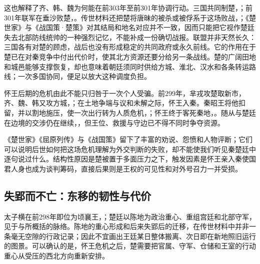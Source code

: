 这也解释了齐、韩、魏为何能在前303年至前301年协调行动。三国共同制楚，；前301年联军在垂沙败楚，。传世材料还把楚将唐昧的被杀或被俘系于这场败战，；《楚世家》与《战国策·楚策》对其结局和地名对应并不一致，因而只能把它视作楚廷失去北部防线统帅的一种强烈记忆，不能补成一份确切战报。联盟并非天然长久：三国各有对楚的顾虑，战后也没有形成稳定的共同政府或永久前线。它的作用在于楚已在对秦竞争中付出代价时，使其北方资源还要分给另一条战线。楚的广阔田地和城邑能够支撑恢复，却也意味着朝廷须同时供给方城、淮北、汉水和各条转运路线；一次多国协同，便足以放大这种调度负担。

怀王后期的危机由此不能只归咎于一次个人受骗。前299年，芈戎攻楚取新市，齐、魏、韩又攻方城，；在土地争端与议和未解之际，怀王入秦。秦昭王将他扣留，并以割地施压，使一次出行转为人质危机，；怀王终于客死秦地，。随从与楚廷在边境的交涉仍在继续，，但王位、救援与守边已不得不同时争夺资源。

《楚世家》《屈原列传》与《战国策》留下了丰富的劝说、怨愤和人物评断；它们可以说明后世如何把这场危机理解为外交判断的失败，却不能使我们听见秦楚廷中逐句说过什么。结构性原因是楚被置于多面压力之下，触发因素是怀王亲入秦使国君人身也成为谈判筹码，直接后果则是王权的可见性和对外号召力一并受损。

\subsection{失郢而不亡：东移的韧性与代价}

太子横在前298年即位为顷襄王，；楚廷以陈地为政治重心、重组宫廷和北部守军，见于与所概括的脉络。陈地的重心形成和后来失郢后的迁移，在传世材料中并非一条毫无空隙的行政记录；因此不宜画出王廷某日整体搬离、次日即在新地照旧运行的图景。可以确认的是，怀王危机之后，楚需要把官属、守军、仓储和王室的行动重心从受压的西北方向重新安排。

